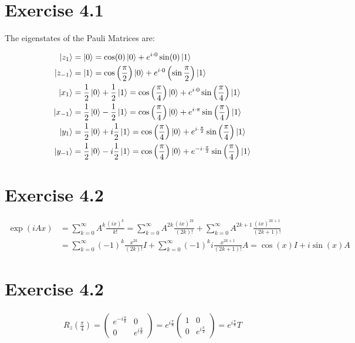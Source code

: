\documentclass{article}
\begin{document}
\section{Exercise 4.1}

The eigenstates of the Pauli Matrices are:

\begin{align*}
    \ket{z_1} &= \ket{0} = \cos (0) \ket{0} + e^{i\cdot 0} \sin (0) \ket{1}\\
    \ket{z_{-1}} &= \ket{1} = \cos\left(\frac{\pi}{2}\right) \ket{0} + e^{i\cdot 0} \left(\sin\frac{\pi}{2}\right) \ket{1}\\
    \ket{x_1} &= \frac{1}{2}\ket{0} + \frac{1}{2}\ket{1} = \cos\left( \frac{\pi}{4} \right) \ket{0} + e^{i\cdot 0} \sin\left( \frac{\pi}{4} \right) \ket{1}\\
    \ket{x_{-1}} &= \frac{1}{2}\ket{0} - \frac{1}{2}\ket{1} = \cos\left( \frac{\pi}{4} \right) \ket{0} + e^{i\cdot \pi} \sin\left( \frac{\pi}{4} \right) \ket{1}\\
    \ket{y_1} &= \frac{1}{2}\ket{0} + i \frac{1}{2}\ket{1} = \cos\left( \frac{\pi}{4} \right) \ket{0} + e^{i\cdot \frac{\pi}{2}} \sin\left( \frac{\pi}{4} \right) \ket{1}\\
    \ket{y_{-1}} &= \frac{1}{2}\ket{0} - i \frac{1}{2}\ket{1} = \cos\left( \frac{\pi}{4} \right) \ket{0} + e^{- i\cdot \frac{\pi}{2}} \sin\left( \frac{\pi}{4} \right) \ket{1}
\end{align*}

\section{Exercise 4.2}


\begin{align*}
 \exp(iAx) &= \sum_{k=0}^\infty A^k \frac {(ix)^k}{k!} =
 \sum_{k=0}^\infty A^{2k} \frac {(ix)^{2k}}{(2k)!}  + 
 \sum_{k=0}^\infty A^{2k+1} \frac {(ix)^{2k+1}}{(2k+1)!} \\
 &= \sum_{k=0}^\infty (-1)^k \frac {x^{2k}}{(2k)!} I + 
 \sum_{k=0}^\infty (-1)^k i \frac {x^{2k+1}}{(2k+1)!} A =
 \cos(x) I + i\sin(x)A
\end{align*}

\section{Exercise 4.2}

\begin{align*}
    R_z \left(\frac{\pi}{4} \right) = 
    \begin{pmatrix}
        e^{-i\frac{\pi}{8}} & 0 \\  0 & e^{i\frac{\pi}{8}}
    \end{pmatrix} 
    = 
    e^{i\frac{\pi}{8}} 
    \begin{pmatrix}
        1 & 0 \\  0 & e^{i\frac{\pi}{4}}
    \end{pmatrix} 
    = 
    e^{i\frac{\pi}{8}}  T 
\end{align*}
\end{document}

